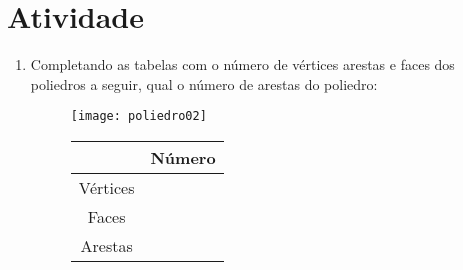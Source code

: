 \documentclass[oneside,a4paper,12pt]{article}
\begin{document}
\section{Atividade}
\begin{enumerate}
\item Completando as tabelas com o número de vértices arestas e faces dos poliedros a seguir, qual o número de arestas do poliedro:
\begin{figure}[!htb]
\begin{multicols}{2}
\begin{center}
\texttt{[image: poliedro02]}
\end{center}
\begin{center}
\begin{tabular}{|c|c|}
\hline 
 & Número \\ 
\hline 
Vértices &  \\ 
\hline 
Faces &  \\ 
\hline 
Arestas &  \\ 
\hline 
\end{tabular} 
\end{center}
\end{multicols}
\end{figure}
\end{enumerate}
\end{document}
